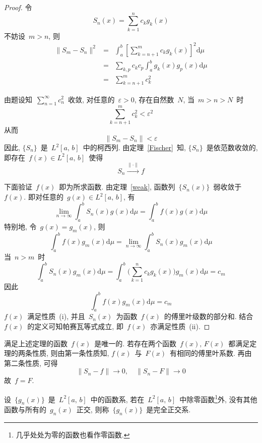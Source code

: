\begin{proof}
令
\[
S_{n}(x)=\sum_{k=1}^{n}c_{k}g_{k}(x)
\]
不妨设~$m>n$, 则
\begin{eqnarray*}
\|S_{m}-S_{n}\|^{2}&=&\int_{a}^{b}\left[\sum_{k=n+1}^{m}c_{k}g_{k}(x)\right]^{2}\mathrm{d}\mu\\
&=& \sum_{k,p}c_{k}c_{p}\int_{a}^{b}g_{k}(x)g_{p}(x)\mathrm{d}\mu \\
&=& \sum_{k=n+1}^{m}c_{k}^{2}
\end{eqnarray*}

由题设知~$\sum\limits_{n=1}^{\infty}c_{n}^{2}$~收敛, 对任意的~$\varepsilon>0$, 存在自然数~$N$, 当~$m>n>N$~时
\[
\sum_{k=n+1}^{m}c_{k}^{2}<\varepsilon^{2}
\]
从而
\[
\|S_{m}-S_{n}\|<\varepsilon
\]
因此, $\{S_{n}\}$~是~$L^2[a,\,b]$~中的柯西列. 由定理~\ref{Fischer}~知, $\{S_{n}\}$~是依范数收敛的, 即存在~$f(x)\in L^2[a,\,b]$~使得
\[
S_{n}\xrightarrow{\mathrm{\|\cdot\|}} f
\]

下面验证~$f(x)$~即为所求函数. 由定理~\ref{weak}, 函数列~$\{S_{n}(x)\}$~弱收敛于~$f(x)$. 即对任意的~$g(x)\in L^2[a,\,b]$, 有
\[
\lim\limits_{n\rightarrow\infty}\int_{a}^{b}S_{n}(x)g(x)\mathrm{d}\mu=\int_{a}^{b}f(x)g(x)\mathrm{d}\mu
\]
特别地, 令~$g(x)=g_{m}(x)$, 则
\[
\int_{a}^{b}f(x)g_{m}(x)\mathrm{d}\mu=\lim\limits_{n\rightarrow\infty}\int_{a}^{b}S_{n}(x)g_{m}(x)\mathrm{d}\mu
\]
当~$n>m$~时
\[
\int_{a}^{b}S_{n}(x)g_{m}(x)\mathrm{d}\mu=\int_{a}^{b}\Big(\sum_{k=1}^{n}c_{k}g_{k}(x)\Big)g_{m}(x)\mathrm{d}\mu=c_{m}
\]
因此
\[
\int_{a}^{b}f(x)g_{m}(x)\mathrm{d}\mu=c_{m}
\]
$f(x)$~满足性质~(i), 并且~$S_{n}(x)$~为函数~$f(x)$~的傅里叶级数的部分和. 结合~$f(x)$~的定义可知帕赛瓦等式成立, 即~$f(x)$~亦满足性质~(ii).
\end{proof}
\begin{Remark}
满足上述定理的函数~$f(x)$~是唯一的. 若存在两个函数~$f(x), \, F(x)$~都满足定理的两条性质, 则由第一条性质知, $f(x)$~与~$F(x)$~有相同的傅里叶系数. 再由第二条性质, 可得
\[
\|S_{n}-f\|\rightarrow 0,\quad \|S_{n}-F\|\rightarrow 0
\]
故~$f=F$.
\end{Remark}

\setcounter{footnote}{0}
\begin{Definition}\label{Def-6-11}
设~$\{g_{n}(x)\}$~是~$L^2[a,\,b]$~中的函数系, 若在~$L^2[a,\,b]$~中除零函数\footnote{几乎处处为零的函数也看作零函数.}外, 没有其他函数与所有的~$g_{n}(x)$~正交, 则称~$\{g_{n}(x)\}$~是完全正交系.
\end{Definition}

